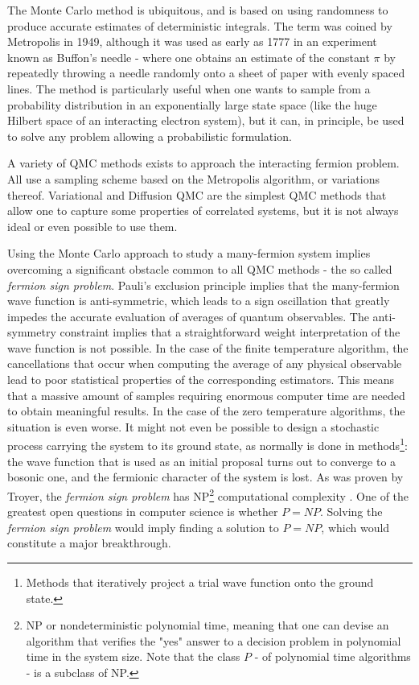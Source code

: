The Monte Carlo method is ubiquitous, and is based on using randomness to produce accurate estimates of deterministic integrals.
The term was coined by Metropolis in 1949, although it was used as early as 1777 in an experiment known as Buffon's needle - where one obtains an estimate of the constant $\pi$ by repeatedly throwing a needle randomly onto a sheet of paper with evenly spaced lines. %
The method is particularly useful when one wants to sample from a probability distribution in an exponentially large state space (like the huge Hilbert space of an interacting electron system), but it can, in principle, be used to solve any problem allowing a probabilistic formulation.

A variety of \ac{QMC} methods exists to approach the interacting fermion problem.
All use a sampling scheme based on the Metropolis algorithm, or variations thereof.
Variational and Diffusion \ac{QMC} are the simplest \ac{QMC} methods that allow one to capture some properties of correlated systems, but it is not always ideal or even possible to use them. 

Using the Monte Carlo approach to study a many-fermion system implies overcoming a significant obstacle common to all \ac{QMC} methods - the so called \emph{fermion sign problem}.
Pauli's exclusion principle implies that the many-fermion wave function is anti-symmetric, which leads to a sign oscillation that greatly impedes the accurate evaluation of averages of quantum observables.
The anti-symmetry constraint implies that a  straightforward weight interpretation of the wave function is not possible.
In the case of the finite temperature algorithm, the cancellations that occur when computing the average of any physical observable lead to poor statistical properties of the corresponding estimators.
This means that a massive amount of samples requiring enormous computer time are needed to obtain meaningful results.
In the case of the zero temperature algorithms, the situation is even worse.
It might not even be possible to design a stochastic process carrying the system to its ground state, as normally is done in  methods\footnote{Methods that iteratively project a trial wave function onto the ground state.}: the wave function that is used as an initial proposal turns out to converge to a bosonic one, and the fermionic character of the system is lost.
As was proven by Troyer, the \emph{fermion sign problem} has NP\footnote{NP or nondeterministic polynomial time, meaning that one can devise an algorithm that verifies the "yes" answer to a decision problem in polynomial time in the system size.
Note that the class $P$ - of polynomial time algorithms - is a subclass of NP.} computational complexity \cite{troyer_computational_2005}.
One of the greatest open questions in computer science is whether $P = NP$.
Solving the \emph{fermion sign problem} would imply finding a solution to $P = NP$, which would constitute a major breakthrough.

